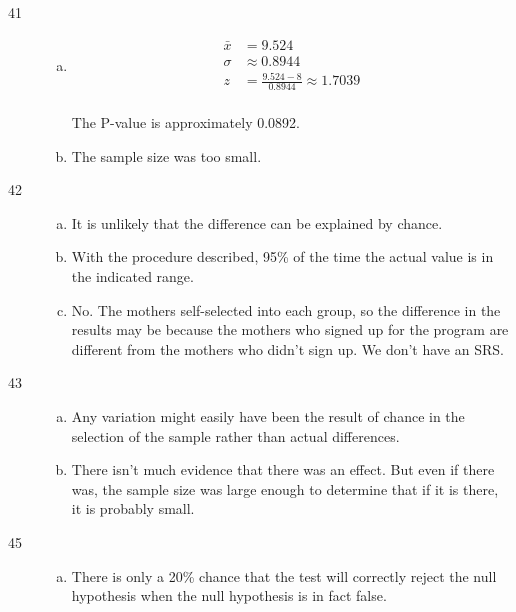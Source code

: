\documentclass[letterpaper, landscape]{exam}
\begin{document}
\begin{description}
      \item[41] 
        \begin{enumerate}[(a)]
          \item 
            \begin{align*}
              \bar{x} & = 9.524 \\
              \sigma  & \approx 0.8944 \\
              z       & = \frac{9.524 - 8}{0.8944} \approx 1.7039 \\
            \end{align*}

            The P-value is approximately 0.0892.

          \item The sample size was too small.
        \end{enumerate}

      \item[42] 
        \begin{enumerate}[(a)]
          \item It is unlikely that the difference can be explained by chance.

          \item With the procedure described, 95\% of the time the actual value
            is in the indicated range.

          \item No. The mothers self-selected into each group, so the difference
            in the results may be because the mothers who signed up for the
            program are different from the mothers who didn't sign up. We don't
            have an SRS\@.
        \end{enumerate}
        
      \newpage

      \item[43]
        \begin{enumerate}[(a)]
          \item Any variation might easily have been the result of chance in the
            selection of the sample rather than actual differences.

          \item There isn't much evidence that there was an effect. But even if
            there was, the sample size was large enough to determine that if it
            is there, it is probably small.
        \end{enumerate}

      \item[45]
        \begin{enumerate}[(a)]
          \item There is only a 20\% chance that the test will correctly reject the
            null hypothesis when the null hypothesis is in fact false.


\end{enumerate}
\end{description}
\end{document}
